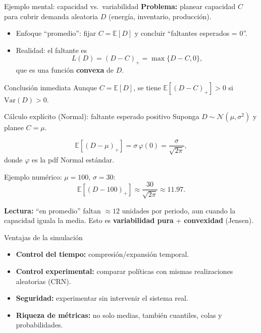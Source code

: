 \documentclass[aspectratio=1610, 9pt]{beamer}
\begin{document}
\begin{frame}{Ejemplo mental: capacidad vs.\ variabilidad}
\textbf{Problema:} planear capacidad $C$ para cubrir demanda aleatoria $D$ (energía, inventario, producción).

\begin{itemize}
  \item Enfoque ``promedio'': fijar $C=\mathbb E[D]$ y concluir ``faltantes esperados = 0''.
  \item Realidad: el faltante es
  \[
    L(D) = (D-C)_+ = \max\{D-C,0\},
  \]
  que es una función \textbf{convexa} de $D$.
\end{itemize}

\begin{block}{Conclusión inmediata}
Aunque $C=\mathbb E[D]$, se tiene $\mathbb E[(D-C)_+] > 0$ si $\mathrm{Var}(D)>0$.
\end{block}
\end{frame}

\begin{frame}{Cálculo explícito (Normal): faltante esperado positivo}
Suponga $D\sim \mathcal N(\mu,\sigma^2)$ y planee $C=\mu$.

\[
\mathbb E[(D-\mu)_+] = \sigma\,\varphi(0) = \frac{\sigma}{\sqrt{2\pi}},
\]
donde $\varphi$ es la pdf Normal estándar.

\medskip
Ejemplo numérico: $\mu=100$, $\sigma=30$:
\[
\mathbb E[(D-100)_+] \approx \frac{30}{\sqrt{2\pi}} \approx 11.97.
\]

\textbf{Lectura:} ``en promedio'' faltan \(\approx 12\) unidades por periodo, aun cuando la capacidad iguala la media.  
Esto es \textbf{variabilidad pura} + \textbf{convexidad} (Jensen).
\end{frame}

\begin{frame}{Ventajas de la simulación}
\begin{itemize}
  \item \textbf{Control del tiempo:} compresión/expansión temporal.
  \item \textbf{Control experimental:} comparar políticas con mismas realizaciones aleatorias (CRN).
  \item \textbf{Seguridad:} experimentar sin intervenir el sistema real.
  \item \textbf{Riqueza de métricas:} no solo medias, también cuantiles, colas y probabilidades.
\end{itemize}
\end{frame}
\end{document}

